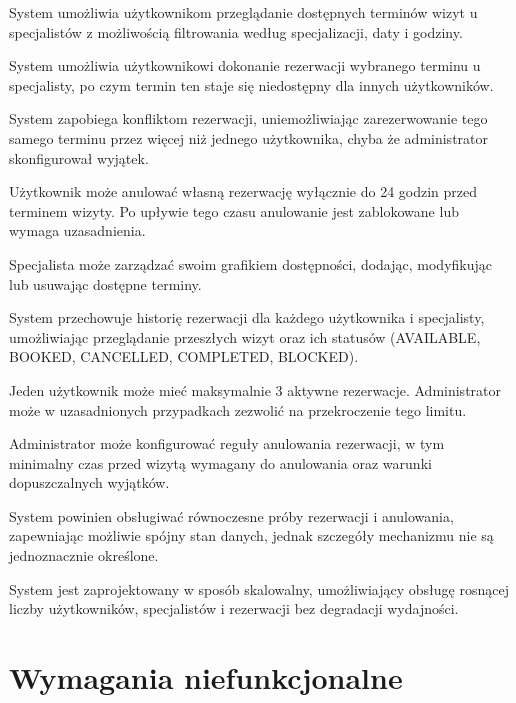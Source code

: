 \documentclass[12pt,a4paper]{article}
\begin{document}
\begin{description}[leftmargin=1.8cm, labelwidth=1.3cm, labelsep=0.5cm, style=nextline]
  \item[FR1] System umożliwia użytkownikom przeglądanie dostępnych terminów wizyt u specjalistów z możliwością filtrowania według specjalizacji, daty i godziny.
  \item[FR2] System umożliwia użytkownikowi dokonanie rezerwacji wybranego terminu u specjalisty, po czym termin ten staje się niedostępny dla innych użytkowników.
  \item[FR3] System zapobiega konfliktom rezerwacji, uniemożliwiając zarezerwowanie tego samego terminu przez więcej niż jednego użytkownika, chyba że administrator skonfigurował wyjątek.
  \item[FR4] Użytkownik może anulować własną rezerwację wyłącznie do 24 godzin przed terminem wizyty. Po upływie tego czasu anulowanie jest zablokowane lub wymaga uzasadnienia.
  \item[FR5] Specjalista może zarządzać swoim grafikiem dostępności, dodając, modyfikując lub usuwając dostępne terminy.
  \item[FR6] System przechowuje historię rezerwacji dla każdego użytkownika i specjalisty, umożliwiając przeglądanie przeszłych wizyt oraz ich statusów (AVAILABLE, BOOKED, CANCELLED, COMPLETED, BLOCKED).
  \item[FR7] Jeden użytkownik może mieć maksymalnie 3 aktywne rezerwacje. Administrator może w uzasadnionych przypadkach zezwolić na przekroczenie tego limitu.
  \item[FR8] Administrator może konfigurować reguły anulowania rezerwacji, w tym minimalny czas przed wizytą wymagany do anulowania oraz warunki dopuszczalnych wyjątków.
  \item[FR9] System powinien obsługiwać równoczesne próby rezerwacji i anulowania, zapewniając możliwie spójny stan danych, jednak szczegóły mechanizmu nie są jednoznacznie określone.
  \item[FR10] System jest zaprojektowany w sposób skalowalny, umożliwiający obsługę rosnącej liczby użytkowników, specjalistów i rezerwacji bez degradacji wydajności.
\end{description}

\section{Wymagania niefunkcjonalne}
\end{document}
